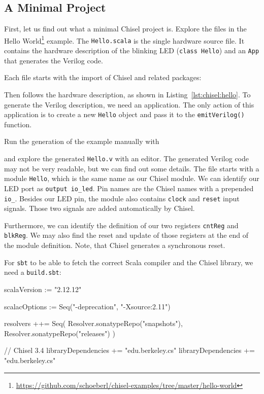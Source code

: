 \documentclass[%
    10pt,
    headinclude, footexclude,
    openright, %
    notitlepage,
    cleardoubleempty,
    headsepline,
    pointlessnumbers,
    bibtotoc, idxtotoc,
    ]{scrbook}
\newcommand{\code}[1]{{\small{\texttt{#1}}}}
\newcommand{\myref}[2]{\href{#1}{#2}}
\renewcommand{\myref}[2]{{#2}{\footnote{\url{#1}}}}
\begin{document}
\subsection{A Minimal Project}

First, let us find out what a minimal Chisel project is. Explore the files in the
\myref{https://github.com/schoeberl/chisel-examples/tree/master/hello-world}{Hello World}
example.
The \code{Hello.scala} is the single hardware source file.
It contains the hardware description of the blinking LED (\code{class Hello})
and an \code{App} that generates the Verilog code.

Each file starts with the import of Chisel and related packages:


\noindent Then follows the hardware description, as shown in Listing~\ref{lst:chisel:hello}.
To generate the Verilog description, we need an application. 
The only action of this application is to create a new \code{Hello} object and pass it
to the \code{emitVerilog()} function.


\noindent Run the generation of the example manually with


and explore the generated \code{Hello.v} with an editor. The generated Verilog code may not be
very readable, but we can find out some details. The file starts with a module \code{Hello},
which is the same name as our Chisel module. We can identify our LED port as
\code{output io\_led}. Pin names are the Chisel names with a prepended \code{io\_}.
Besides our LED pin, the module also contains \code{clock} and \code{reset} input signals.
Those two signals are added automatically by Chisel.

Furthermore, we can identify the definition of our two registers \code{cntReg} and \code{blkReg}.
We may also find the reset and update of those registers at the end of the module definition.
Note, that Chisel generates a synchronous reset.

For \code{sbt} to be able to fetch the correct Scala compiler and the Chisel library,
we need a \code{build.sbt}:

\begin{chisel}
scalaVersion := "2.12.12"

scalacOptions := Seq("-deprecation", "-Xsource:2.11")

resolvers ++= Seq(
  Resolver.sonatypeRepo("snapshots"),
  Resolver.sonatypeRepo("releases")
)

// Chisel 3.4
libraryDependencies += "edu.berkeley.cs" %
libraryDependencies += "edu.berkeley.cs" %
\end{chisel}
\end{document}
